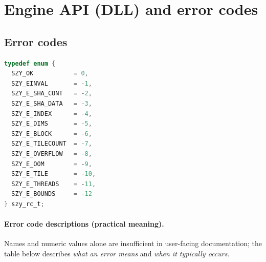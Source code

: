 \documentclass[11pt,a4paper]{article}
\begin{document}
\section{Engine API (DLL) and error codes}

\subsection{Error codes}
\begin{lstlisting}[style=cstyle,language=C,caption={Error codes (szy\_rc.h)}]
typedef enum {
  SZY_OK           = 0,
  SZY_EINVAL       = -1,
  SZY_E_SHA_CONT   = -2,
  SZY_E_SHA_DATA   = -3,
  SZY_E_INDEX      = -4,
  SZY_E_DIMS       = -5,
  SZY_E_BLOCK      = -6,
  SZY_E_TILECOUNT  = -7,
  SZY_E_OVERFLOW   = -8,
  SZY_E_OOM        = -9,
  SZY_E_TILE       = -10,
  SZY_E_THREADS    = -11,
  SZY_E_BOUNDS     = -12
} szy_rc_t;
\end{lstlisting}

\paragraph{Error code descriptions (practical meaning).}
Names and numeric values alone are insufficient in user-facing documentation; the table below describes \emph{what an error means} and \emph{when it typically occurs}.
\end{document}
